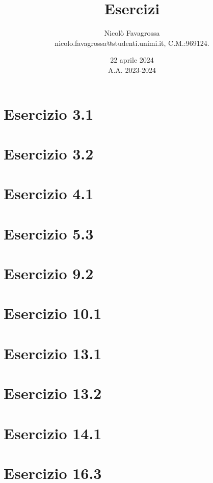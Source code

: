 \documentclass[11pt]{article}
\title{Esercizi}
\author{Nicolò Favagrossa\\nicolo.favagrossa@studenti.unimi.it, C.M.:969124.}
\date{22 aprile 2024\\A.A. 2023-2024}
\begin{document}
\maketitle
\tableofcontents
\newpage
\section{Esercizio 3.1}

\newpage
\section{Esercizio 3.2}

\newpage
\section{Esercizio 4.1}

\newpage
\section{Esercizio 5.3}

\newpage
\section{Esercizio 9.2}

\newpage
\section{Esercizio 10.1}

\newpage
\section{Esercizio 13.1}

\newpage
\section{Esercizio 13.2}

\newpage
\section{Esercizio 14.1}

\newpage
\section{Esercizio 16.3}

\end{document}

